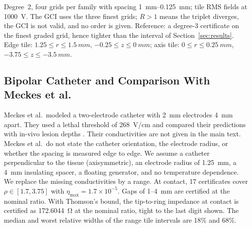 \documentclass[11pt]{article}
\begin{document}
\begin{table}[t]
\centering
\caption{Grid Convergence Index Versus Certified Intervals for the Monopolar Electrode}\label{tab:gci}
\small\setlength{\tabcolsep}{3pt}
\par\vspace{2pt}\footnotesize\raggedright Degree~2, four grids per family with spacing \SIrange{1}{0.125}{mm}; tile RMS fields at \SI{1000}{V}. The GCI uses the three finest grids; $R>1$ means the triplet diverges, the GCI is not valid, and no order is given. Reference: a degree-3 certificate on the finest graded grid, hence tighter than the interval of Section~\ref{sec:results}. Edge tile: $1.25\le r\le\SI{1.5}{mm}$, $-0.25\le z\le\SI{0}{mm}$; axis tile: $0\le r\le\SI{0.25}{mm}$, $-3.75\le z\le\SI{-3.5}{mm}$.
\end{table}

\subsection{Bipolar Catheter and Comparison With Meckes et al.}
Meckes et al.\ modeled a two-electrode catheter with \SI{2}{mm} electrodes
\SI{4}{mm} apart. They used a lethal threshold of \SI{268}{V/cm} and compared
their predictions with in-vivo lesion depths \cite{meckes2022}. Their
conductivities are not given in the main text. Meckes et al.\ do
not state the catheter orientation, the electrode radius, or whether the spacing is
measured edge to edge. We assume a catheter
perpendicular to the tissue (axisymmetric), an electrode radius of
\SI{1.25}{mm}, a \SI{4}{mm} insulating spacer, a floating generator, and no temperature dependence. We replace the missing conductivities by a range. At contact, 17 certificates cover $\rho\in[1.7,3.75]$ with
$\eta_{\max}=1.7\times10^{-5}$. Gaps of 1--\SI{4}{mm} are certified at the
nominal ratio. With Thomson's bound, the tip-to-ring impedance at contact is
certified as \SI{172.6044}{\ohm} at the nominal ratio, tight to the last
digit shown. The median and worst relative widths of the range tile
intervals are 18\% and 68\%.
\end{document}
